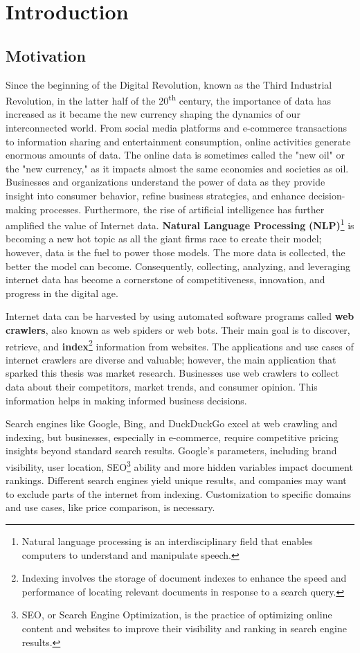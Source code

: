 \chapter{Introduction}
\label{chap:introduction}
\section{Motivation}


Since the beginning of the Digital Revolution, known as the Third Industrial Revolution, in the latter half of the 20\textsuperscript{th} century, the importance of data has increased as it became the new currency shaping the dynamics of our interconnected world. From social media platforms and e-commerce transactions to information sharing and entertainment consumption, online activities generate enormous amounts of data. The online data is sometimes called the "new oil" or the "new currency," as it impacts almost the same economies and societies as oil. Businesses and organizations understand the power of data as they provide insight into consumer behavior, refine business strategies, and enhance decision-making processes. Furthermore, the rise of artificial intelligence has further amplified the value of Internet data. \textbf{Natural Language Processing} \textbf{(NLP)}\footnote{Natural language processing is an interdisciplinary field that enables computers to understand and manipulate speech.} is becoming a new hot topic as all the giant firms race to create their model; however, data is the fuel to power those models. The more data is collected, the better the model can become. Consequently, collecting, analyzing, and leveraging internet data has become a cornerstone of competitiveness, innovation, and progress in the digital age.


Internet data can be harvested by using automated software programs called \textbf{web crawlers}, also known as web spiders or web bots. Their main goal is to discover, retrieve, and \textbf{index}\footnote{Indexing involves the storage of document indexes to enhance the speed and performance of locating relevant documents in response to a search query.} information from websites. The applications and use cases of internet crawlers are diverse and valuable; however, the main application that sparked this thesis was market research. Businesses use web crawlers to collect data about their competitors, market trends, and consumer opinion. This information helps in making informed business decisions.
 
Search engines like Google, Bing, and DuckDuckGo excel at web crawling and indexing, but businesses, especially in e-commerce, require competitive pricing insights beyond standard search results. Google's parameters, including brand visibility, user location, SEO\footnote{SEO, or Search Engine Optimization, is the practice of optimizing online content and websites to improve their visibility and ranking in search engine results.} ability and more hidden variables impact document rankings. Different search engines yield unique results, and companies may want to exclude parts of the internet from indexing. Customization to specific domains and use cases, like price comparison, is necessary.


